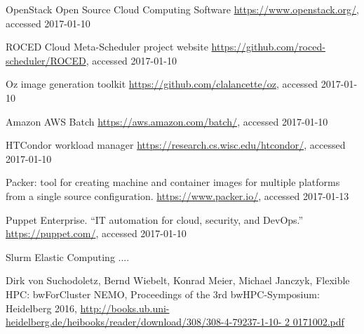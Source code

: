 \begin{thebibliography}{}
%
%
OpenStack Open Source Cloud Computing Software
\url{https://www.openstack.org/}, accessed 2017-01-10

ROCED Cloud Meta-Scheduler project website
\url{https://github.com/roced-scheduler/ROCED}, accessed 2017-01-10

Oz image generation toolkit
\url{https://github.com/clalancette/oz}, accessed 2017-01-10

Amazon AWS Batch
\url{https://aws.amazon.com/batch/}, accessed 2017-01-10

HTCondor workload manager
\url{https://research.cs.wisc.edu/htcondor/}, accessed 2017-01-10


Packer: tool for creating machine and container images for multiple platforms from a single source configuration. 
\url{https://www.packer.io/}, accessed 2017-01-13


Puppet Enterprise. ``IT automation for cloud, security, and DevOps.''
\url{https://puppet.com/}, accessed 2017-01-10

Slurm Elastic Computing ....


Dirk von Suchodoletz, Bernd Wiebelt, Konrad Meier, Michael Janczyk,
  Flexible HPC: bwForCluster NEMO,
  Proceedings of the 3rd bwHPC-Symposium: Heidelberg 2016,
  \url{
http://books.ub.uni-heidelberg.de/heibooks/reader/download/308/308-4-79237-1-10-
2 0171002.pdf}


\end{thebibliography}



